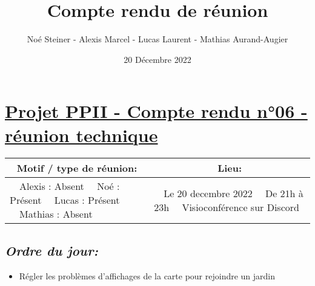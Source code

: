 \documentclass[french,a4paper]{article}
\author{Noé Steiner - Alexis Marcel - Lucas Laurent - Mathias Aurand-Augier}
\date{20 Décembre 2022}
\newcommand{\tabitem}{\textbullet~~}\title{Compte rendu de réunion}
\begin{document}
\maketitle

\section*{\underline{Projet PPII - Compte rendu n°06 - réunion technique}}

\begin{table}[!htb]
  \centering
  \begin{tabular}{| p{7cm} | p{7cm} |}
    \hline
    \multicolumn{1}{|c|}{ Motif / type de réunion:} & \multicolumn{1}{c|}{Lieu:} \\
    \hline
    \tabitem Alexis : Absent\newline
    \tabitem Noé : Présent\newline
    \tabitem Lucas : Présent\newline
    \tabitem Mathias : Absent                      &
    \tabitem Le 20 decembre 2022\newline
    \tabitem De 21h à 23h\newline
    \tabitem Visioconférence sur Discord                                         \\
    \hline
  \end{tabular}
\end{table}

\subsection*{\textit{Ordre du jour:}}

\begin{itemize}
  \item Régler les problèmes d'affichages de la carte pour rejoindre un jardin
\end{itemize}
\end{document}
